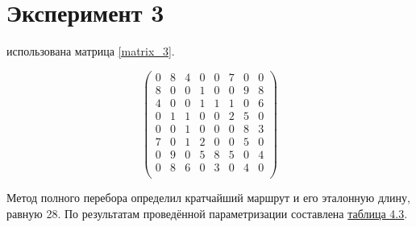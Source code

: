 \section{Эксперимент 3}
 использована матрица \ref{matrix_3}.

\begin{scriptsize} 
	\begin{equation}\label{matrix_3}
		\left(
		\begin{array}{cccccccc}
			0& 8& 4& 0& 0& 7& 0& 0\\
			8&  0& 0& 1& 0& 0& 9& 8\\
			4& 0&  0& 1& 1& 1& 0& 6\\
			0& 1& 1&  0& 0& 2& 5& 0\\
			0& 0& 1& 0&  0& 0& 8& 3\\
			7& 0& 1& 2& 0&  0& 5& 0\\
			0& 9& 0& 5& 8& 5&  0& 4\\
			0& 8& 6& 0& 3& 0& 4&  0\\
		\end{array}\right)
\end{equation} \end{scriptsize}

Метод полного перебора определил кратчайший маршрут и его эталонную длину, равную 28. По результатам проведённой параметризации составлена \hyperref[table_3]{таблица 4.3}.



